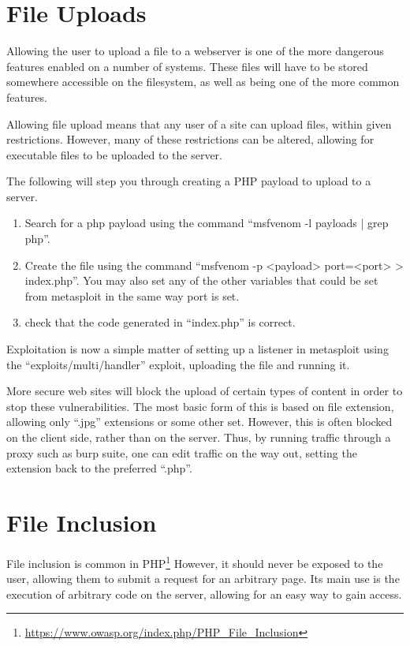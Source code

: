 	\section{File Uploads}
		Allowing the user to upload a file to a webserver is one of the more dangerous features enabled on a number of systems.
		These files will have to be stored somewhere accessible on the filesystem, as well as being one of the more common features.

		Allowing file upload means that any user of a site can upload files, within given restrictions.
		However, many of these restrictions can be altered, allowing for executable files to be uploaded to the server.

		The following will step you through creating a PHP payload to upload to a server.
		\begin{enumerate}
			\item Search for a php payload using the command ``msfvenom -l payloads | grep php''.
			\item Create the file using the command ``msfvenom -p <payload> port=<port> > index.php''.
				You may also set any of the other variables that could be set from metasploit in the same way port is set.
			\item check that the code generated in ``index.php'' is correct.
		\end{enumerate}

		Exploitation is now a simple matter of setting up a listener in metasploit using the ``exploits/multi/handler'' exploit, uploading the file and running it.

		More secure web sites will block the upload of certain types of content in order to stop these vulnerabilities.
		The most basic form of this is based on file extension, allowing only ``.jpg'' extensions or some other set.
		However, this is often blocked on the client side, rather than on the server.
		Thus, by running traffic through a proxy such as burp suite,
		one can edit traffic on the way out, setting the extension back to the preferred ``.php''.
	\section{File Inclusion}
		File inclusion is common in PHP\footnote{\url{https://www.owasp.org/index.php/PHP\_File\_Inclusion}}
		However, it should never be exposed to the user, allowing them to submit a request for an arbitrary page.
		Its main use is the execution of arbitrary code on the server, allowing for an easy way to gain access.

